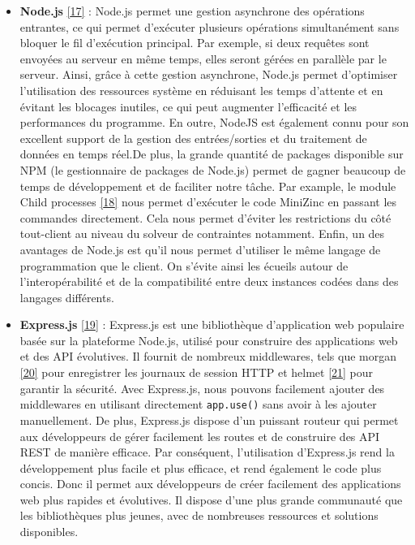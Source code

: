 \documentclass[12pt]{article}
\begin{document}
\begin{itemize}
  \item
        \textbf{Node.js} \protect\hyperlink{ref-Node_js}{{[}17{]}} : Node.js
        permet une gestion asynchrone des opérations entrantes, ce qui permet
        d'exécuter plusieurs opérations simultanément sans bloquer le fil
        d'exécution principal. Par exemple, si deux requêtes sont envoyées au
        serveur en même temps, elles seront gérées en parallèle par le
        serveur. Ainsi, grâce à cette gestion asynchrone, Node.js permet
        d'optimiser l'utilisation des ressources système en réduisant les
        temps d'attente et en évitant les blocages inutiles, ce qui peut
        augmenter l'efficacité et les performances du programme. En outre,
        NodeJS est également connu pour son excellent support de la gestion
        des entrées/sorties et du traitement de données en temps
        réel.\newline  De plus, la grande quantité de packages disponible sur
        NPM (le gestionnaire de packages de Node.js) permet de gagner beaucoup
        de temps de développement et de faciliter notre tâche. Par example, le
        module Child processes
        \protect\hyperlink{ref-Child_Processes}{{[}18{]}} nous permet
        d'exécuter le code MiniZinc en passant les commandes directement. Cela
        nous permet d'éviter les restrictions du côté tout-client au niveau du
        solveur de contraintes notamment. Enfin, un des avantages de Node.js
        est qu'il nous permet d'utiliser le même langage de programmation que
        le client. On s'évite ainsi les écueils autour de l'interopérabilité
        et de la compatibilité entre deux instances codées dans des langages
        différents.
  \item
        \textbf{Express.js} \protect\hyperlink{ref-Express_js}{{[}19{]}} :
        Express.js est une bibliothèque d'application web populaire basée sur
        la plateforme Node.js, utilisé pour construire des applications web et
        des API évolutives. Il fournit de nombreux middlewares, tels que
        morgan \protect\hyperlink{ref-morgan}{{[}20{]}} pour enregistrer les
        journaux de session HTTP et helmet
        \protect\hyperlink{ref-helmet}{{[}21{]}} pour garantir la sécurité.
        Avec Express.js, nous pouvons facilement ajouter des middlewares en
        utilisant directement \texttt{app.use()} sans avoir à les ajouter
        manuellement. De plus, Express.js dispose d'un puissant routeur qui
        permet aux développeurs de gérer facilement les routes et de
        construire des API REST de manière efficace. Par conséquent,
        l'utilisation d'Express.js rend la développement plus facile et plus
        efficace, et rend également le code plus concis. Donc il permet aux
        développeurs de créer facilement des applications web plus rapides et
        évolutives. Il dispose d'une plus grande communauté que les
        bibliothèques plus jeunes, avec de nombreuses ressources et solutions
        disponibles.
\end{itemize}
\end{document}
